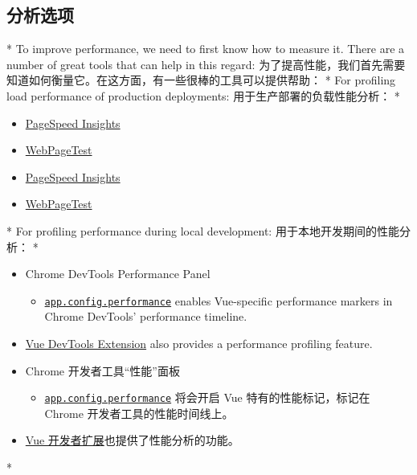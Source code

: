 \begin{paracol}{2}
\subsection{分析选项}
\switchcolumn[0]*%
To improve performance, we need to first know how to measure it. There
are a number of great tools that can help in this regard:
\switchcolumn
为了提高性能，我们首先需要知道如何衡量它。在这方面，有一些很棒的工具可以提供帮助：
\switchcolumn[0]*%
For profiling load performance of production deployments:
\switchcolumn
用于生产部署的负载性能分析：
\switchcolumn[0]*%
\begin{itemize}
\item
  \href{https://pagespeed.web.dev/}{PageSpeed Insights}
\item
  \href{https://www.webpagetest.org/}{WebPageTest}
\end{itemize}
\switchcolumn
\begin{itemize}
\item
  \href{https://pagespeed.web.dev/}{PageSpeed Insights}
\item
  \href{https://www.webpagetest.org/}{WebPageTest}
\end{itemize}
\switchcolumn[0]*%
For profiling performance during local development:
\switchcolumn
用于本地开发期间的性能分析：
\switchcolumn[0]*%
\begin{itemize}
\item
  Chrome DevTools Performance Panel
  \begin{itemize}
  \item
    \href{https://vuejs.org/api/application.html\#app-config-performance}{\texttt{app.config.performance}}
    enables Vue-specific performance markers in Chrome DevTools'
    performance timeline.
  \end{itemize}
\item
  \href{https://vuejs.org/guide/scaling-up/tooling.html\#browser-devtools}{Vue
  DevTools Extension} also provides a performance profiling feature.
\end{itemize}
\switchcolumn
\begin{itemize}
\item
  Chrome 开发者工具``性能''面板
  \begin{itemize}
  \item
    \href{https://cn.vuejs.org/api/application.html\#app-config-performance}{\texttt{app.config.performance}}
    将会开启 Vue 特有的性能标记，标记在 Chrome
    开发者工具的性能时间线上。
  \end{itemize}
\item
  \href{https://cn.vuejs.org/guide/scaling-up/tooling.html\#browser-devtools}{Vue
  开发者扩展}也提供了性能分析的功能。
\end{itemize}
\switchcolumn[0]*%

\end{paracol}
